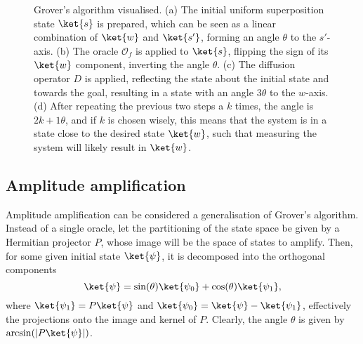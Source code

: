 \begin{figure}
    \caption{
        Grover's algorithm visualised.
        (a) The initial uniform superposition state $\ket{s}$ is prepared, which can be seen as a linear combination of $\ket{w}$ and $\ket{s'}$, forming an angle $\theta$ to the $s'$-axis.
        (b) The oracle $\mathcal{O}_f$ is applied to $\ket{s}$, flipping the sign of its $\ket{w}$ component, inverting the angle $\theta$.
        (c) The diffusion operator $D$ is applied, reflecting the state about the initial state and towards the goal, resulting in a state with an angle $3\theta$ to the $w$-axis.
        (d) After repeating the previous two steps a $k$ times, the angle is $2k+1\theta$, and if $k$ is chosen wisely, this means that the system is in a state close to the desired state $\ket{w}$, such that measuring the system will likely result in $\ket{w}$.
    }
    \label{fig:grover}
\end{figure}

\subsection{Amplitude amplification}
\label{sec:amplitude-amplification}
Amplitude amplification can be considered a generalisation of Grover's algorithm.
Instead of a single oracle, let the partitioning of the state space be given by a Hermitian projector $P$, whose image will be the space of states to amplify.
Then, for some given initial state $\ket{\psi}$, it is decomposed into the orthogonal components
\begin{equation}
    \ket{\psi} = \sin(\theta)\ket{\psi_0} + \cos(\theta)\ket{\psi_1},
\end{equation}
where $\ket{\psi_1} = P\ket{\psi}$ and $\ket{\psi_0} = \ket{\psi} - \ket{\psi_1}$, effectively the projections onto the image and kernel of $P$.
Clearly, the angle $\theta$ is given by $\arcsin(|P\ket{\psi}|)$.

